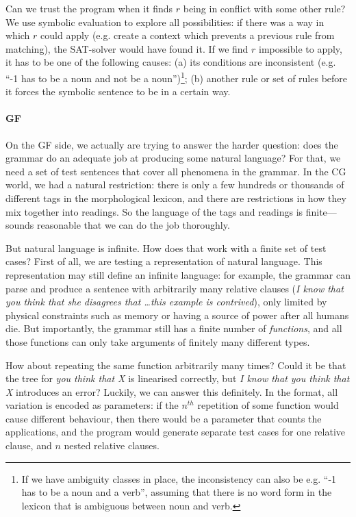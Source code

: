 
Can we trust the program when it finds $r$ being in conflict with some
other rule? We use symbolic evaluation to explore all possibilities:
if there was a way in which $r$ could apply (e.g. create a context
which prevents a previous rule from matching), the SAT-solver would
have found it. If we find $r$ impossible to apply, it has to be one of
the following causes: (a) its conditions are inconsistent (e.g. ``-1
has to be a noun and not be a noun'')\footnote{If we have ambiguity
  classes in place, the inconsistency can also be e.g. ``-1 has to be
  a noun and a verb'', assuming that there is no word form in the lexicon that
  is ambiguous between noun and verb.}; (b) another rule or set of
rules before it forces the symbolic sentence to be in a certain way.





\paragraph{GF} On the GF side, we actually are trying to answer the
harder question: does the grammar do an adequate job at producing
some natural language? For that, we need a set of test sentences that
cover all phenomena in the grammar. In the CG world, we had a natural
restriction: there is only a few hundreds or thousands of different
tags in the morphological lexicon, and there are restrictions in how
they mix together into readings. So the language of the tags and
readings is finite---sounds reasonable that we can do the job
thoroughly.

But natural language is infinite. How does that work with a finite set
of test cases? First of all, we are testing a \pmcfg{} representation
of natural language. This representation may still define an infinite
language: for example, the grammar can parse and produce a sentence
with arbitrarily many relative clauses (\emph{I know that you think
  that she disagrees that \dots this example is contrived}), only
limited by physical constraints such as memory or having a source of
power after all humans die. But importantly, the grammar still has a
finite number of \emph{functions}, and all those functions can only
take arguments of finitely many different types.

How about repeating the same function arbitrarily many times? Could it
be that the tree for {\em you think that X} is linearised correctly,
but {\em I know that you think that X} introduces an error?  Luckily,
we can answer this definitely.  In the \pmcfg{} format, all variation
is encoded as parameters: if the $n^{th}$ repetition of some function
would cause different behaviour, then there would be a parameter that
counts the applications, and the program would generate separate test
cases for one relative clause, and $n$ nested relative clauses.

